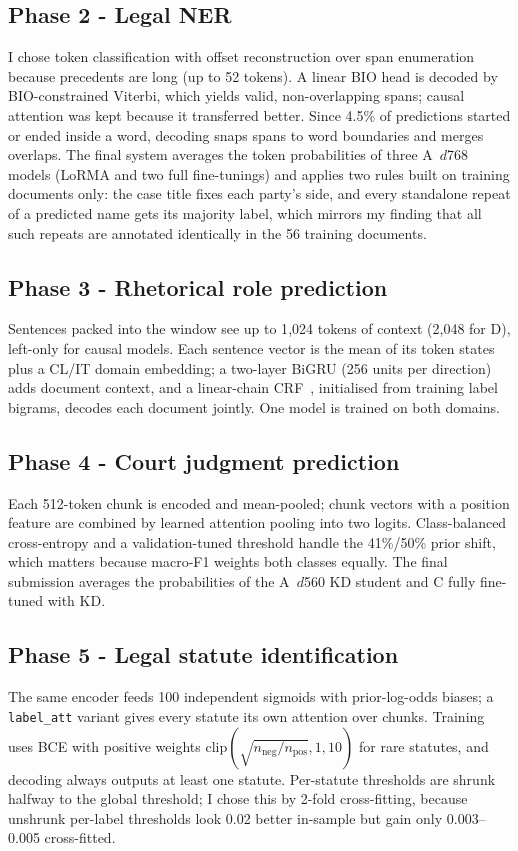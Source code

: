 \documentclass[11pt, oneside]{article}
\begin{document}
\subsection{Phase 2 - Legal NER}
I chose token classification with offset reconstruction over span enumeration because precedents are long (up to 52
tokens). A linear BIO head is decoded by BIO-constrained Viterbi, which yields valid, non-overlapping spans; causal
attention was kept because it transferred better. Since 4.5\% of predictions started or ended inside a word, decoding
snaps spans to word boundaries and merges overlaps. The final system averages the token probabilities of three
A~$d$768 models (LoRMA and two full fine-tunings) and applies two rules built on training documents only: the case
title fixes each party's side, and every standalone repeat of a predicted name gets its majority label, which mirrors
my finding that all such repeats are annotated identically in the 56 training documents.

\subsection{Phase 3 - Rhetorical role prediction}
Sentences packed into the window see up to 1{,}024 tokens of context (2{,}048 for D), left-only for causal models. Each
sentence vector is the mean of its token states plus a CL/IT domain embedding; a two-layer BiGRU (256 units per
direction) adds document context, and a linear-chain CRF~\cite{lafferty2001crf}, initialised from training label
bigrams, decodes each document jointly. One model is trained on both domains.

\subsection{Phase 4 - Court judgment prediction}
Each 512-token chunk is encoded and mean-pooled; chunk vectors with a position feature are combined by learned
attention pooling into two logits. Class-balanced cross-entropy and a validation-tuned threshold handle the
41\%/50\% prior shift, which matters because macro-F1 weights both classes equally. The final submission averages the
probabilities of the A~$d$560 KD student and C fully fine-tuned with KD.

\subsection{Phase 5 - Legal statute identification}
The same encoder feeds 100 independent sigmoids with prior-log-odds biases; a \texttt{label\_att} variant gives every
statute its own attention over chunks. Training uses BCE with positive weights
$\mathrm{clip}(\sqrt{n_{\text{neg}}/n_{\text{pos}}},1,10)$ for rare statutes, and decoding always outputs at least one
statute. Per-statute thresholds are shrunk halfway to the global threshold; I chose this by 2-fold cross-fitting,
because unshrunk per-label thresholds look 0.02 better in-sample but gain only 0.003--0.005 cross-fitted.
\end{document}
